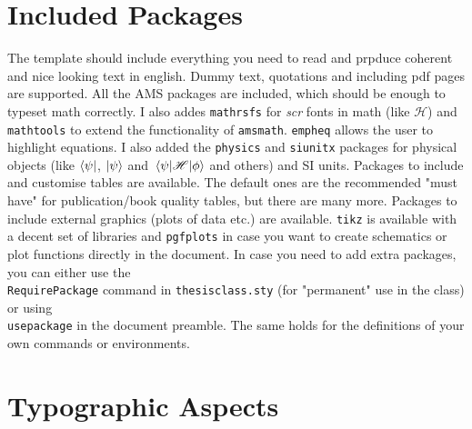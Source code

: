 \section{Included Packages}

The template should include everything you need to read and prpduce coherent and nice looking text in english. Dummy text, quotations and including pdf pages are supported. All the AMS packages are included, which should be enough to typeset math correctly. I also addes \texttt{mathrsfs} for \textit{scr} fonts in math (like $\mathscr{H}$) and \texttt{mathtools} to extend the functionality of \texttt{amsmath}. \texttt{empheq} allows the user to highlight equations. I also added the \texttt{physics} and \texttt{siunitx} packages for physical objects (like $\bra{\psi}$, $\ket{\psi}$ and $\mel{\psi}{\mathscr{H}}{\phi}$ and others) and SI units. Packages to include and customise tables are available. The default ones are the recommended "must have" for publication/book quality tables, but there are many more. Packages to include external graphics (plots of data etc.) are available. \texttt{tikz} is available with a decent set of libraries and \texttt{pgfplots} in case you want to create schematics or plot functions directly in the document. In case you need to add extra packages, you can either use the \texttt{\\RequirePackage} command in \texttt{thesisclass.sty} (for "permanent" use in the class) or using \texttt{\\usepackage} in the document preamble. The same holds for the definitions of your own commands or environments. 

\section{Typographic Aspects}

